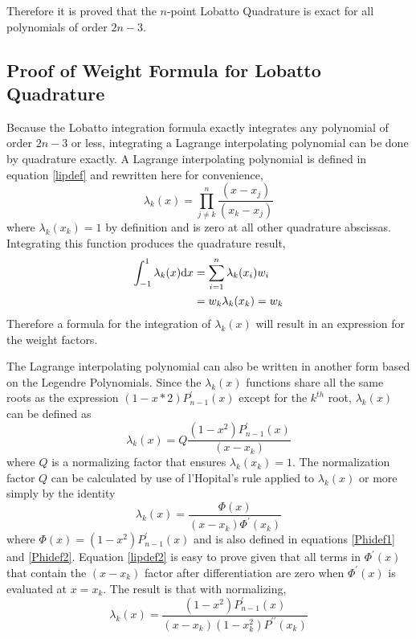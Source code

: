 Therefore it is proved that the $n$-point Lobatto Quadrature is exact for all 
polynomials of order $2n-3$. 

\subsection{Proof of Weight Formula for Lobatto Quadrature}
Because the Lobatto integration formula exactly integrates any polynomial of order
$2n-3$ or less, integrating a Lagrange interpolating polynomial can be done by 
quadrature exactly. A Lagrange interpolating polynomial is defined in equation 
\ref{lipdef} and rewritten here for convenience, 
\begin{equation}
\lambda_k(x)=\prod_{j \ne k}^n\frac{(x-x_j)}{(x_k-x_j)} \nonumber
\end{equation}
where $\lambda_k(x_k)=1$ by definition and is zero at all other quadrature abscissas. 
Integrating this function produces the quadrature result, 
\begin{align}
\label{lipint1}
\int_{-1}^{1} \lambda_k(x){\rm d}x &= \sum_{i=1}^{n} \lambda_k(x_i)w_i \nonumber \\
&= w_k\lambda_k(x_k) = w_k
\end{align}
Therefore a formula for the integration of $\lambda_k(x)$ will result in 
an expression for the weight factors. 

The Lagrange interpolating polynomial can also be written in another form
based on the Legendre Polynomials. Since the $\lambda_k(x)$ functions share
all the same roots as the expression $(1-x*2)P^\prime_{n-1}(x)$ except for
the $k^{th}$ root, $\lambda_k(x)$ can be defined as
\begin{equation}
\lambda_k(x)=Q\frac{(1-x^2)P^\prime_{n-1}(x)}{(x-x_k)}
\end{equation}
where $Q$ is a normalizing factor that ensures $\lambda_k(x_k)=1$. 
The normalization factor $Q$ can be calculated by use of l'Hopital's rule
applied to $\lambda_k(x)$ or more simply by the identity \cite{Dahlquist_gaussquad}
\begin{equation}
\label{lipdef2}
\lambda_k(x)=\frac{\Phi(x)}{(x-x_k)\Phi^\prime(x_k)}
\end{equation}
where $\Phi(x)=(1-x^2)P_{n-1}^\prime(x)$ and is also defined in equations \ref{Phidef1}
and \ref{Phidef2}. Equation \ref{lipdef2} is easy to prove given that all terms in 
$\Phi^\prime(x)$ that contain the $(x-x_k)$ factor after differentiation are zero when
$\Phi^\prime(x)$ is evaluated at $x=x_k$. 
The result is that with normalizing, 
\begin{equation}
\label{lipdef3}
\lambda_k(x)=\frac{(1-x^2)P^\prime_{n-1}(x)}{(x-x_k)(1-x_k^2)P^{\prime\prime}(x_k)}
\end{equation}

